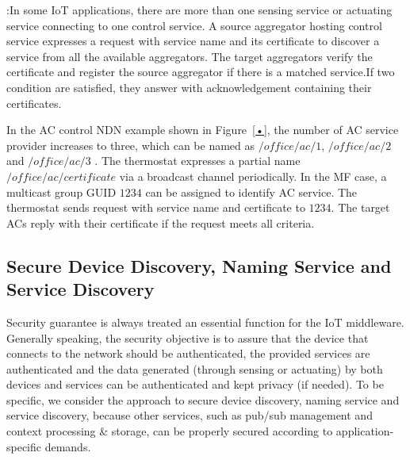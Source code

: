 \vspace{1mm}:In some IoT applications, there are more than one sensing service or actuating service connecting to one control service. A source aggregator hosting control service expresses a request with service name and its certificate to discover a service from all the available aggregators. The target aggregators verify the certificate and register the source   aggregator if there is a matched service.If two condition are satisfied, they answer with acknowledgement containing their certificates.

In the AC control NDN example shown in Figure~\ref{•}, the number of AC service provider increases to three, which can be named as $/office/ac/1$, $/office/ac/2$ and $/office/ac/3$ . The thermostat expresses a partial name $/office/ac/certificate$ via a broadcast channel periodically. In the MF case, a multicast group GUID $1234$ can be assigned to identify AC service. The thermostat sends request with service name and certificate to $1234$. The target ACs reply with their certificate if the request meets all criteria.

\subsection{Secure Device Discovery, Naming Service and Service Discovery}
Security guarantee is always treated an essential function for the IoT middleware. Generally speaking, the security objective is to assure that the device that connects to the network should be authenticated, the provided services are authenticated and the data generated (through sensing or actuating) by both devices and services can be authenticated and kept privacy (if needed). To be specific, we consider the approach to secure device discovery, naming service and service discovery, because other services, such as pub/sub management and context processing \& storage, can be properly secured according to application-specific demands.
 
